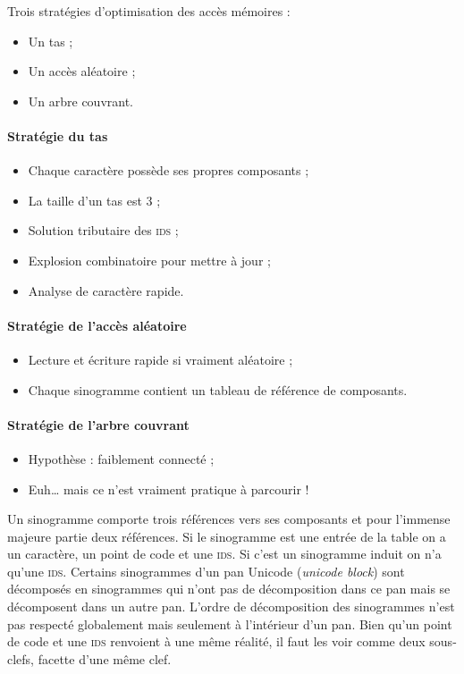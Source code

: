 \documentclass[12pt,onecolumn]{article}
\begin{document}
Trois stratégies d'optimisation des accès mémoires :
\begin{itemize}
\item Un tas ;
\item Un accès aléatoire ;
\item Un arbre couvrant.
\end{itemize}

\paragraph{Stratégie du tas}
\begin{itemize}
\item Chaque caractère possède ses propres composants ;
\item La taille d'un tas est 3 ;
\item Solution tributaire des \textsc{ids} ;
\item Explosion combinatoire pour mettre à jour ;
\item Analyse de caractère rapide.
\end{itemize}

\paragraph{Stratégie de l'accès aléatoire}
\begin{itemize}
\item Lecture et écriture rapide si vraiment aléatoire ;
\item Chaque sinogramme contient un tableau de référence de composants.
\end{itemize}

\paragraph{Stratégie de l'arbre couvrant}
\begin{itemize}
\item Hypothèse : faiblement connecté ;
\item Euh\dots{} mais ce n'est vraiment pratique à parcourir !
\end{itemize}

Un sinogramme comporte trois références vers ses composants et pour l'immense majeure partie deux références. Si le sinogramme est une entrée de la table on a un caractère, un point de code et une \textsc{ids}. Si c'est un sinogramme induit on n'a qu'une \textsc{ids}. Certains sinogrammes d'un pan Unicode (\textsl{unicode block}) sont décomposés en sinogrammes qui n'ont pas de décomposition dans ce pan mais se décomposent dans un autre pan. L'ordre de décomposition des sinogrammes n'est pas respecté globalement mais seulement à l'intérieur d'un pan. Bien qu'un point de code et une \textsc{ids} renvoient à une même réalité, il faut les voir comme deux sous-clefs, facette d'une même clef.
\end{document}
